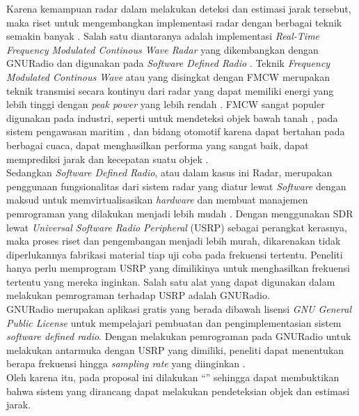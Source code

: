 Karena kemampuan radar dalam melakukan deteksi dan estimasi jarak tersebut, maka riset untuk mengembangkan implementasi radar dengan berbagai teknik semakin banyak \cite{Jia2020,Xia2021,MoraHuaman2020,Sundaresan2015}. Salah satu diantaranya adalah implementasi \textit{Real-Time Frequency Modulated Continous Wave Radar} yang dikembangkan dengan GNURadio dan digunakan pada \textit{Software Defined Radio} \cite{Sundaresan2015}. Teknik \textit{Frequency Modulated Continous Wave} atau yang disingkat dengan FMCW merupakan teknik transmisi secara kontinyu dari radar yang dapat memiliki energi yang lebih tinggi dengan \textit{peak power} yang lebih rendah \cite{Stasiak2017}. FMCW sangat populer digunakan pada industri, seperti untuk mendeteksi objek bawah tanah \cite{Macasero2018}, pada sistem pengawasan maritim \cite{Lestari2017}, dan bidang otomotif  karena dapat bertahan pada berbagai cuaca, dapat menghasilkan performa yang sangat baik, dapat memprediksi jarak dan kecepatan suatu objek \cite{Deng2017}. \\

Sedangkan \textit{Software Defined Radio}, atau dalam kasus ini Radar, merupakan penggunaan fungsionalitas dari sistem radar yang diatur lewat \textit{Software} dengan maksud untuk memvirtualisasikan \textit{hardware} dan membuat manajemen pemrograman yang dilakukan menjadi lebih mudah \cite{Zeng2019}. Dengan menggunakan SDR lewat \textit{Universal Software Radio Peripheral} (USRP) sebagai perangkat kerasnya, maka proses riset dan pengembangan menjadi lebih murah, dikarenakan tidak diperlukannya fabrikasi material tiap uji coba pada frekuensi tertentu. Peneliti hanya perlu memprogram USRP yang dimilikinya untuk menghasilkan frekuensi tertentu yang mereka inginkan. Salah satu alat yang dapat digunakan dalam melakukan pemrograman terhadap USRP adalah GNURadio.\\


GNURadio merupakan aplikasi gratis yang berada dibawah lisensi \textit{GNU General Public License} untuk mempelajari pembuatan dan pengimplementasian sistem \textit{software defined radio}. Dengan melakukan pemrograman pada GNURadio untuk melakukan antarmuka dengan USRP yang dimiliki, peneliti dapat menentukan berapa frekuensi hingga \textit{sampling rate} yang diinginkan \cite{Prabaswara2011}.\\


Oleh karena itu, pada proposal ini dilakukan “\judul” sehingga dapat membuktikan bahwa sistem yang dirancang dapat melakukan pendeteksian objek dan estimasi jarak.


